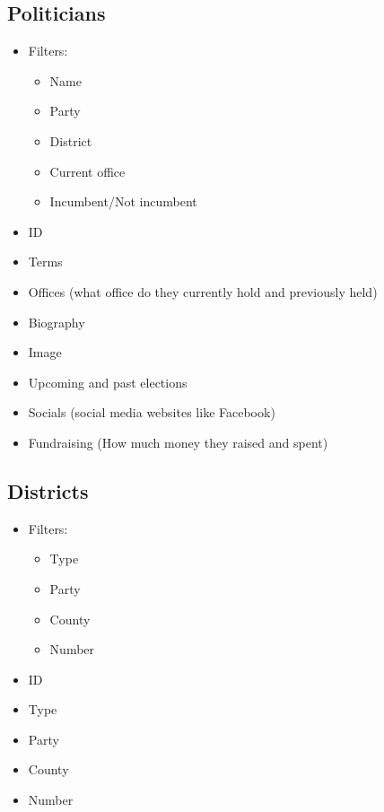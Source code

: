 \documentclass[11t]{article}
\begin{document}
\subsection{Politicians}
\begin{itemize}
    \item Filters:
    \begin{itemize}
        \item Name
        \item Party 
        \item District
        \item Current office 
        \item Incumbent/Not incumbent
    \end{itemize}
    \item ID
    \item Terms 
    \item Offices (what office do they currently hold and previously held)
    \item Biography 
    \item Image
    \item Upcoming and past elections
    \item Socials (social media websites like Facebook)
    \item Fundraising (How much money they raised and spent)
\end{itemize}

\subsection{Districts}
\begin{itemize}
    \item Filters:
    \begin{itemize}
        \item Type
        \item Party
        \item County
        \item Number
    \end{itemize}
    \item ID
    \item Type
    \item Party
    \item County
    \item Number
\end{itemize}
\end{document}
